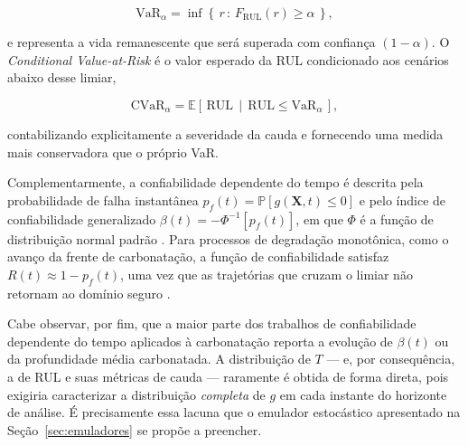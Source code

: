 \begin{equation}
\mathrm{VaR}_\alpha = \inf\left\{\, r \,:\, F_{\mathrm{RUL}}(r) \geq \alpha \,\right\},
\label{eq:var}
\end{equation}

\noindent e representa a vida remanescente que será superada com confiança $(1-\alpha)$. O \textit{Conditional Value-at-Risk} é o valor esperado da RUL condicionado aos cenários abaixo desse limiar,

\begin{equation}
\mathrm{CVaR}_\alpha = \mathbb{E}\left[\, \mathrm{RUL} \,\middle|\, \mathrm{RUL} \leq \mathrm{VaR}_\alpha \,\right],
\label{eq:cvar}
\end{equation}

\noindent contabilizando explicitamente a severidade da cauda e fornecendo uma medida mais conservadora que o próprio VaR.

Complementarmente, a confiabilidade dependente do tempo é descrita pela probabilidade de falha instantânea $p_f(t) = \mathbb{P}[g(\mathbf{X},t) \leq 0]$ e pelo índice de confiabilidade generalizado $\beta(t) = -\Phi^{-1}[p_f(t)]$, em que $\Phi$ é a função de distribuição normal padrão \parencite{melchers2018}. Para processos de degradação monotônica, como o avanço da frente de carbonatação, a função de confiabilidade satisfaz $R(t) \approx 1 - p_f(t)$, uma vez que as trajetórias que cruzam o limiar não retornam ao domínio seguro \parencite{ellingwood2005}.

Cabe observar, por fim, que a maior parte dos trabalhos de confiabilidade dependente do tempo aplicados à carbonatação reporta a evolução de $\beta(t)$ ou da profundidade média carbonatada. A distribuição de $T$ --- e, por consequência, a de RUL e suas métricas de cauda --- raramente é obtida de forma direta, pois exigiria caracterizar a distribuição \textit{completa} de $g$ em cada instante do horizonte de análise. É precisamente essa lacuna que o emulador estocástico apresentado na Seção~\ref{sec:emuladores} se propõe a preencher.
